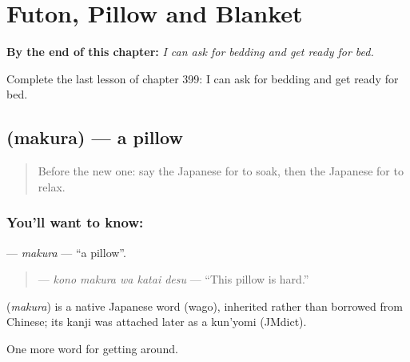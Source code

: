 
\chapter{Futon, Pillow and Blanket}
\label{ch:ja-futon-pillow-and-blanket}

\begin{chapteropening}
\textbf{By the end of this chapter:} \emph{I can ask for bedding and get ready for bed.}

Complete the last lesson of chapter 399: I can ask for bedding and get ready for bed.
\end{chapteropening}

\section[\texorpdfstring{\ja{まくら} (makura)}{まくら (makura)}]{ (makura) — a pillow}

\label{lesson:JA-C399-makura}



\begin{quote}
Before the new one: say the Japanese for to soak, then the Japanese for to relax.
\end{quote}

\subsection*{You'll want to know: }
\textbf{} — \emph{makura} — \textquotedblleft{}a pillow\textquotedblright{}.

\begin{quote}
\textbf{  } — \emph{kono makura wa katai desu} — \textquotedblleft{}This pillow is hard.\textquotedblright{}
\end{quote}

\begin{cousinweb}
\textbf{} (\emph{makura}) is a native Japanese word (wago), inherited rather than borrowed from Chinese; its kanji was attached later as a kun'yomi (JMdict).
\end{cousinweb}

\begin{grammarlens}[title={What you've built}]
One more word for getting around.
\end{grammarlens}

